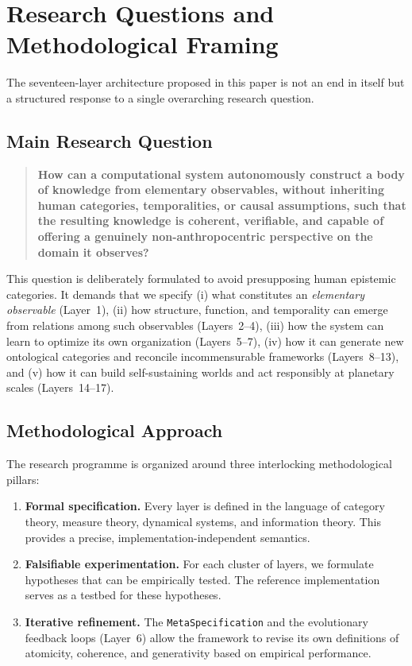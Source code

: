 \section{Research Questions and Methodological Framing}
\label{sec:research_questions}

The seventeen-layer architecture proposed in this paper is not an end in itself but a structured response to a single overarching research question.

\subsection{Main Research Question}
\label{subsec:main_rq}

\begin{quote}
\textbf{How can a computational system autonomously construct a body of knowledge from elementary observables, without inheriting human categories, temporalities, or causal assumptions, such that the resulting knowledge is coherent, verifiable, and capable of offering a genuinely non-anthropocentric perspective on the domain it observes?}
\end{quote}

This question is deliberately formulated to avoid presupposing human epistemic categories. It demands that we specify (i) what constitutes an \emph{elementary observable} (Layer~1), (ii) how structure, function, and temporality can emerge from relations among such observables (Layers~2--4), (iii) how the system can learn to optimize its own organization (Layers~5--7), (iv) how it can generate new ontological categories and reconcile incommensurable frameworks (Layers~8--13), and (v) how it can build self-sustaining worlds and act responsibly at planetary scales (Layers~14--17).

\subsection{Methodological Approach}
\label{subsec:methodology}

The research programme is organized around three interlocking methodological pillars:
\begin{enumerate}
    \item \textbf{Formal specification.} Every layer is defined in the language of category theory, measure theory, dynamical systems, and information theory. This provides a precise, implementation-independent semantics.
    \item \textbf{Falsifiable experimentation.} For each cluster of layers, we formulate hypotheses that can be empirically tested. The reference implementation serves as a testbed for these hypotheses.
    \item \textbf{Iterative refinement.} The \texttt{MetaSpecification} and the evolutionary feedback loops (Layer~6) allow the framework to revise its own definitions of atomicity, coherence, and generativity based on empirical performance.
\end{enumerate}

